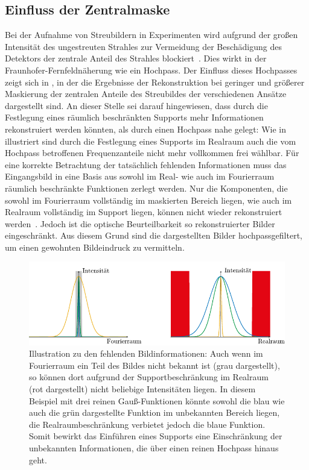 \subsection{Einfluss der Zentralmaske}
Bei der Aufnahme von Streubildern in Experimenten wird aufgrund der großen Intensität des ungestreuten Strahles zur Vermeidung der Beschädigung des Detektors der zentrale Anteil des Strahles blockiert~\cite{schultz2013chapter7}. Dies wirkt in der Fraunhofer-Fernfeldnäherung wie ein Hochpass. Der Einfluss dieses Hochpasses zeigt sich in , in der die Ergebnisse der Rekonstruktion bei geringer und größerer Maskierung der zentralen Anteile des Streubildes der verschiedenen Ansätze dargestellt sind. An dieser Stelle sei darauf hingewiesen, dass durch die Festlegung eines räumlich beschränkten Supports mehr Informationen rekonstruiert werden könnten, als durch einen Hochpass nahe gelegt: Wie in  illustriert sind durch die Festlegung eines Supports im Realraum auch die vom Hochpass betroffenen Frequenzanteile nicht mehr vollkommen frei wählbar. Für eine korrekte Betrachtung der tatsächlich fehlenden Informationen muss das Eingangsbild in eine Basis aus sowohl im Real- wie auch im Fourierraum räumlich beschränkte Funktionen zerlegt werden. Nur die Komponenten, die sowohl im Fourierraum vollständig im maskierten Bereich liegen, wie auch im Realraum vollständig im Support liegen, können nicht wieder rekonstruiert werden~\cite{thibault2006,ulmer2015}. Jedoch ist die optische Beurteilbarkeit so rekonstruierter Bilder eingeschränkt. Aus diesem Grund sind die dargestellten Bilder hochpassgefiltert, um einen gewohnten Bildeindruck zu vermitteln.
\begin{figure}
	\centering
	\includegraphics[width=.9\textwidth]{images/missing.pdf}
	\caption[Fehlende Bildinformationen]{Illustration zu den fehlenden Bildinformationen: Auch wenn im Fourierraum ein Teil des Bildes nicht bekannt ist (grau dargestellt), so können dort aufgrund der Supportbeschränkung im Realraum (rot dargestellt) nicht beliebige Intensitäten liegen. In diesem Beispiel mit drei reinen Gauß-Funktionen könnte sowohl die blau wie auch die grün dargestellte Funktion im unbekannten Bereich liegen, die Realraumbeschränkung verbietet jedoch die blaue Funktion. Somit bewirkt das Einführen eines Supports eine Einschränkung der unbekannten Informationen, die über einen reinen Hochpass hinaus geht.}
	\label{fig:missing}
\end{figure}
